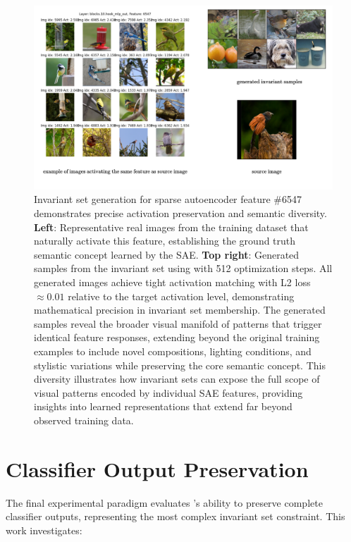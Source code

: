 \begin{figure}[h]
\centering
\includegraphics[width=\linewidth]{figures/main/experiment1.2.pdf}
\caption{Invariant set generation for sparse autoencoder feature \#6547 demonstrates precise activation preservation and semantic diversity. \textbf{Left}: Representative real images from the training dataset that naturally activate this feature, establishing the ground truth semantic concept learned by the SAE. \textbf{Top right}: Generated samples from the invariant set using \method{} with 512 optimization steps. All generated images achieve tight activation matching with L2 loss $\approx 0.01$ relative to the target activation level, demonstrating mathematical precision in invariant set membership. The generated samples reveal the broader visual manifold of patterns that trigger identical feature responses, extending beyond the original training examples to include novel compositions, lighting conditions, and stylistic variations while preserving the core semantic concept. This diversity illustrates how invariant sets can expose the full scope of visual patterns encoded by individual SAE features, providing insights into learned representations that extend far beyond observed training data.}
\label{fig:experiment_1_2}
\end{figure}

\section{Classifier Output Preservation}

The final experimental paradigm evaluates \method{}'s ability to preserve complete classifier outputs, representing the most complex invariant set constraint. This work investigates:

